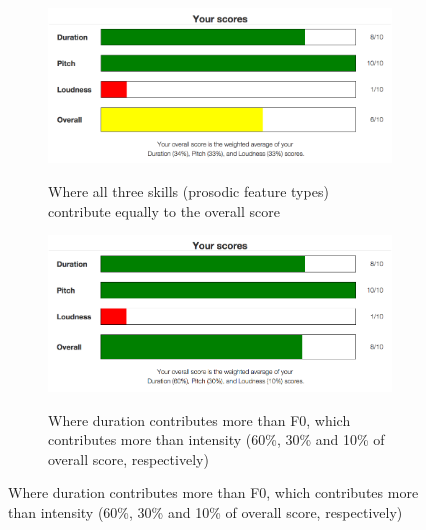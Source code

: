 			\begin{figure}[p]
			\centering
			\caption{Screenshots of explicit feedback via skill bars}
			
			\vspace{1em}
			
			\begin{subfigure}{\textwidth}
			\centering
			\caption{Where all three skills (prosodic feature types) contribute equally to the overall score}
			\includegraphics[width=\textwidth]{img/screenshots/skillBars-balanced}
			\label{fig:skillbars:balanced}
			\end{subfigure}		
			
			\vspace{2em}
			
			\begin{subfigure}{\textwidth}
			\centering
			\caption{Where duration contributes more than F0, which contributes more than intensity (60\%, 30\% and 10\% of overall score, respectively)}
			\includegraphics[width=\textwidth]{img/screenshots/skillBars-durPriority}
			\label{fig:skillbars:durpriority}
			\end{subfigure}
			
			\label{fig:skillbars}
			\end{figure}	
		
		
